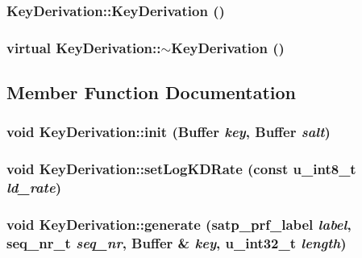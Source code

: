 \subsubsection{\setlength{\rightskip}{0pt plus 5cm}Key\-Derivation::Key\-Derivation ()\hspace{0.3cm}{\tt  [inline]}}\label{classKeyDerivation_07c3735d1b2e1285b6c427a2706ebc67}


\subsubsection{\setlength{\rightskip}{0pt plus 5cm}virtual Key\-Derivation::$\sim$Key\-Derivation ()\hspace{0.3cm}{\tt  [inline, virtual]}}\label{classKeyDerivation_ccce2c32370be2388ca0a977fef1f6cc}




\subsection{Member Function Documentation}
\subsubsection{\setlength{\rightskip}{0pt plus 5cm}void Key\-Derivation::init ({\bf Buffer} {\em key}, {\bf Buffer} {\em salt})}\label{classKeyDerivation_5f03e97de1a041f6012d1fcfabf13773}


\subsubsection{\setlength{\rightskip}{0pt plus 5cm}void Key\-Derivation::set\-Log\-KDRate (const {\bf u\_\-int8\_\-t} {\em ld\_\-rate})}\label{classKeyDerivation_b055afc0de04a6e32631e42f09b32e63}


\subsubsection{\setlength{\rightskip}{0pt plus 5cm}void Key\-Derivation::generate ({\bf satp\_\-prf\_\-label} {\em label}, {\bf seq\_\-nr\_\-t} {\em seq\_\-nr}, {\bf Buffer} \& {\em key}, {\bf u\_\-int32\_\-t} {\em length})}\label{classKeyDerivation_6d319febcad73d199fe8773ae614f70a}


